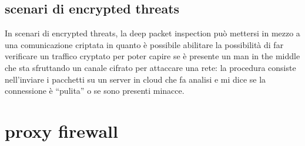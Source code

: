 \documentclass{report}
\begin{document}
\subsection{scenari di encrypted threats}
In scenari di encrypted threats, la deep packet inspection può mettersi in mezzo a una comunicazione criptata in quanto è possibile abilitare la possibilità di far verificare un traffico cryptato per poter capire se è presente un man in the 
middle che sta sfruttando un canale cifrato per attaccare una rete: la procedura consiste nell'inviare i pacchetti su un server in cloud che fa analisi e mi dice se la connessione è “pulita” o se sono presenti minacce. 

\section{proxy firewall}
\end{document}
